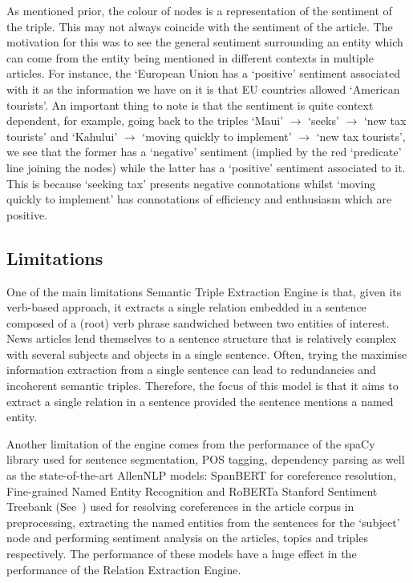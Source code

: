 As mentioned prior, the colour of nodes is a representation of the sentiment of the triple. This may not always coincide with the sentiment of the article. The motivation for this was to see the general sentiment surrounding an entity which can come from the entity being mentioned in different contexts in multiple articles. For instance, the `European Union has a `positive' sentiment associated with it as the information we have on it is that EU countries allowed `American tourists'. An important thing to note is that the sentiment is quite context dependent, for example, going back to the triples `Maui' $\rightarrow$ `seeks'  $\rightarrow$ `new tax tourists' and `Kahului' $\rightarrow$ `moving quickly to implement' $\rightarrow$ `new tax tourists', we see that the former has a `negative' sentiment (implied by the red `predicate' line joining the nodes)  while the latter has a `positive' sentiment associated to it. This is because `seeking tax' presents negative connotations whilst `moving quickly to implement' has connotations of efficiency and enthusiasm which are positive.


\subsection*{Limitations}

One of the main limitations Semantic Triple Extraction Engine is that, given its verb-based approach, it extracts a single relation embedded in a sentence composed of a (root) verb phrase sandwiched between two entities of interest. 
News articles lend themselves to a sentence structure that is relatively complex with several subjects and objects in a single sentence. Often, trying the maximise information extraction from a single sentence can lead to redundancies and incoherent semantic triples. Therefore, the focus of this model is that it aims to extract a single relation in a sentence provided the sentence mentions a named entity. 

Another limitation of the engine comes from the performance of the spaCy library used for sentence segmentation, POS tagging, dependency parsing as well as the state-of-the-art AllenNLP models: SpanBERT for coreference resolution, Fine-grained Named Entity Recognition and RoBERTa Stanford Sentiment Treebank (See~) used for resolving coreferences in the article corpus in preprocessing, extracting the named entities from the sentences for the `subject' node and performing sentiment analysis on the articles, topics and triples respectively. The performance of these models have a huge effect in the performance of the Relation Extraction Engine. 

